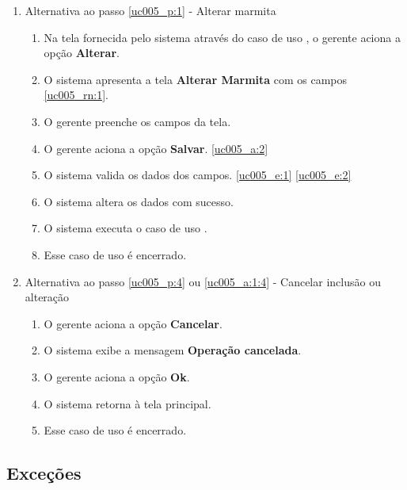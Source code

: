 \begin{enumerate}[label=A\arabic*]
	\item Alternativa ao passo \ref{uc005_p:1} - Alterar marmita \label{uc005_a:1}
	\begin{enumerate}[label*=.\arabic*]
		\item Na tela fornecida pelo sistema através do caso de uso , o gerente aciona a opção \textbf{Alterar}. 
		\item O sistema apresenta a tela \textbf{Alterar Marmita} com os campos \ref{uc005_rn:1}. \label{uc005_a:1:2}
		\item O gerente preenche os campos da tela. \label{uc005_a:1:3}
		\item O gerente aciona a opção \textbf{Salvar}. \label{uc005_a:1:4}\ref{uc005_a:2}
		\item O sistema valida os dados dos campos. \ref{uc005_e:1} \ref{uc005_e:2}
		\item O sistema altera os dados com sucesso.
		\item O sistema executa o caso de uso .
		\item Esse caso de uso é encerrado.
	\end{enumerate}
	
	\item Alternativa ao passo \ref{uc005_p:4} ou \ref{uc005_a:1:4} - Cancelar inclusão ou alteração \label{uc005_a:2}
	\begin{enumerate}[label*=.\arabic*]
		\item O gerente aciona a opção \textbf{Cancelar}.
		\item O sistema exibe a mensagem \textbf{Operação cancelada}.
		\item O gerente aciona a opção \textbf{Ok}.
		\item O sistema retorna à tela principal.
		\item Esse caso de uso é encerrado.
	\end{enumerate}	 	
\end{enumerate}

\subsection{Exceções}

